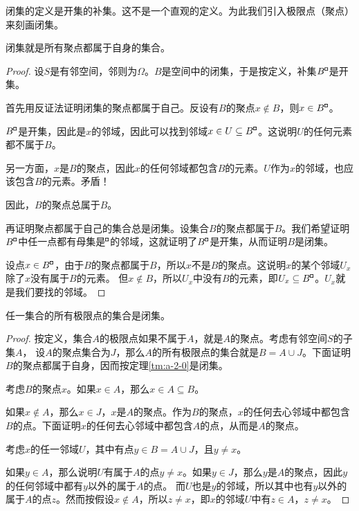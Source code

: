 \documentclass[12pt,UTF8,fontset=none]{ctexbook}
\begin{document}
\begin{appendix}
闭集的定义是开集的补集。这不是一个直观的定义。为此我们引入极限点（聚点）来刻画闭集。

\begin{tm}\label{tm:a-2-0}
    闭集就是所有聚点都属于自身的集合。
\end{tm}

\begin{proof}
    设$S$是有邻空间，邻则为$\Omega$。$B$是空间中的闭集，于是按定义，补集$B^{\bu}$是开集。

    首先用反证法证明闭集的聚点都属于自己。反设有$B$的聚点$x\notin B$，则$x\in B^{\bu}$。

    $B^{\bu}$是开集，因此是$x$的邻域，因此可以找到邻域$x\in U \subseteq B^{\bu}$。这说明$U$的任何元素都不属于$B$。

    另一方面，$x$是$B$的聚点，因此$x$的任何邻域都包含$B$的元素。$U$作为$x$的邻域，也应该包含$B$的元素。矛盾！

    因此，$B$的聚点总属于$B$。

    再证明聚点都属于自己的集合总是闭集。设集合$B$的聚点都属于$B$。我们希望证明$B^{\bu}$中任一点都有母集是$^{\bu}$的邻域，这就证明了$B^{\bu}$是开集，从而证明$B$是闭集。

    设点$x\in B^{\bu}$，由于$B$的聚点都属于$B$，所以$x$不是$B$的聚点。这说明$x$的某个邻域$U_x$除了$x$没有属于$B$的元素。
    但$x \notin B$，所以$U_x$中没有$B$的元素，即$U_x\subseteq B^{\bu}$。$U_x$就是我们要找的邻域。

\end{proof}

\begin{tm}\label{tm:a-2-10}
    任一集合的所有极限点的集合是闭集。
\end{tm}

\begin{proof}
    按定义，集合$A$的极限点如果不属于$A$，就是$A$的聚点。考虑有邻空间$S$的子集$A$，
    设$A$的聚点集合为$J$，那么$A$的所有极限点的集合就是$B = A\cup J$。下面证明$B$的聚点都属于自身，因而按定理\ref{tm:a-2-0}是闭集。

    考虑$B$的聚点$x$。如果$x\in A$，那么$x\in A\subseteq B$。
    
    如果$x\notin A$，那么$x\in J$，$x$是$A$的聚点。作为$B$的聚点，$x$的任何去心邻域中都包含$B$的点。下面证明$x$的任何去心邻域中都包含$A$的点，从而是$A$的聚点。
    
    考虑$x$的任一邻域$U$，其中有点$y\in B = A\cup J$，且$y\neq x$。

    如果$y \in A$，那么说明$U$有属于$A$的点$y\neq x$。如果$y \in J$，那么$y$是$A$的聚点，因此$y$的任何邻域中都有$y$以外的属于$A$的点。
    而$U$也是$y$的邻域，所以其中也有$y$以外的属于$A$的点$z$。然而按假设$x\notin A$，所以$z \neq x$，即$x$的邻域$U$中有$z\in A$，$z\neq x$。


\end{proof}
\end{appendix}
\end{document}

